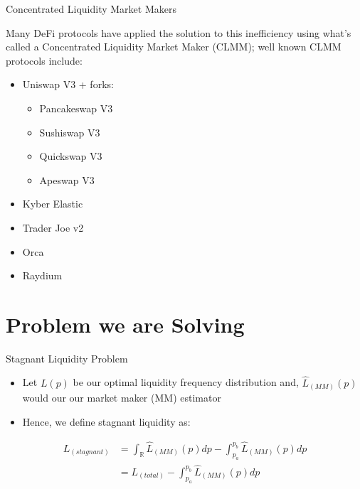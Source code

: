 \documentclass[10pt,xcolor=svgnames]{beamer} %
\begin{document}
\begin{frame}{Concentrated Liquidity Market Makers} 

Many DeFi protocols have applied the solution to this inefficiency using what's called a Concentrated Liquidity Market Maker (CLMM); well known CLMM protocols include:

\begin{itemize} 
\item Uniswap V3 + forks:
     \begin{itemize} 
        \item Pancakeswap V3
        \item Sushiswap V3
        \item Quickswap V3
        \item Apeswap V3
     \end{itemize}
\item Kyber Elastic 
\item Trader Joe v2
\item Orca
\item Raydium
\end{itemize}


\end{frame}

\section{Problem we are Solving}

\begin{frame}{Stagnant Liquidity Problem}

 
\begin{itemize}
  \item Let $L(p)$ be our optimal liquidity frequency distribution and, $\hat{L}_{(MM)}(p)$ would our our market maker (MM) estimator 
  \item Hence, we define stagnant liquidity as:
\end{itemize}

\begin{align*} 
L_{(stagnant)} &= \int_{\mathbb{R}}\hat{L}_{(MM)}(p)dp - \int_{p_{a}}^{p_{b}}\hat{L}_{(MM)}(p)dp\\ 
  &= L_{(total)} - \int_{p_{a}}^{p_{b}}\hat{L}_{(MM)}(p)dp
\end{align*}

\end{frame}
\end{document}
